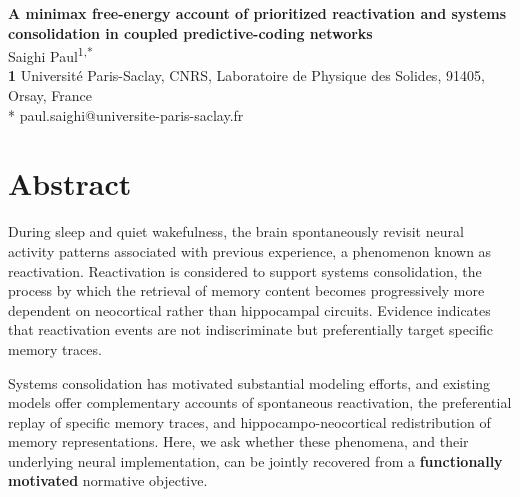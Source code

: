 \documentclass[10pt,letterpaper]{article}
\theoremstyle{plain}
\theoremstyle{remark}
\begin{document}
\begin{flushleft}
{\Large\textbf{A minimax free-energy account of prioritized reactivation and systems consolidation in coupled predictive-coding networks}}
\newline\\
Saighi Paul\textsuperscript{1,*}
\\
\bigskip
\textbf{1} Universit\'e Paris-Saclay, CNRS, Laboratoire de Physique des Solides, 91405, Orsay, France\\
\bigskip
* paul.saighi@universite-paris-saclay.fr
\end{flushleft}


\section*{Abstract}

During sleep and quiet wakefulness, the brain spontaneously revisit neural activity patterns associated with previous experience, a phenomenon known as reactivation. Reactivation is considered to support systems consolidation, the process by which the retrieval of memory content becomes progressively more dependent on neocortical rather than hippocampal circuits. Evidence indicates that reactivation events are not indiscriminate but preferentially target specific memory traces. 

Systems consolidation has motivated substantial modeling efforts, and existing models offer complementary accounts of spontaneous reactivation, the preferential replay of specific memory traces, and hippocampo-neocortical redistribution of memory representations. Here, we ask whether these phenomena, and their underlying neural implementation, can be jointly recovered from a \textbf{functionally motivated} normative objective.
\end{document}
